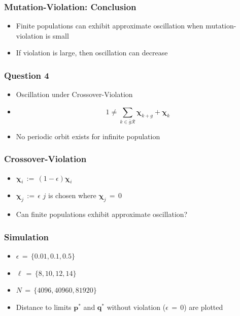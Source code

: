 \documentclass[aspectratio=169]{beamer}
\begin{document}
  
  \begin{frame}
    \frametitle{Mutation-Violation: Conclusion}
    \begin{itemize}      
      \setlength\itemsep{1em}
      \item{Finite populations can exhibit approximate oscillation when mutation-violation is small}
      \item{If violation is large, then oscillation can decrease}      
    \end{itemize}
  \end{frame}
  
   \begin{frame}
    \frametitle{Question 4}
    \begin{itemize}
      \item{Oscillation under Crossover-Violation}      
      \item
      \[	
	1 \neq \sum \limits_{k \in \bar{g}\mathcal{R}} \bm{\chi}_{k+g} + \bm{\chi}_k 
      \]
      \item{No periodic orbit exists for infinite population}
      
    \end{itemize}
  \end{frame}
  
  \begin{frame}
    \frametitle{Crossover-Violation}
    \begin{itemize}
      \setlength\itemsep{1em}
      \item{$\bm{\chi}_i \,:=\, (1 - \epsilon) \bm{\chi}_i$}
      \item{$\bm{\chi}_j \,:=\, \epsilon$  \hspace{1cm}  $j$ is chosen where $\bm{\chi}_j \,=\, 0$}
      \item{Can finite populations exhibit approximate oscillation?}
    \end{itemize}
  \end{frame}
  
  \begin{frame}
    \frametitle{Simulation}
    \begin{itemize}
      \setlength\itemsep{1em}
      \item{$\epsilon \,=\, \{0.01, 0.1, 0.5\}$}      
      \item{$\ell \,=\, \{8,10,12,14\}$}
      \item{$N \,=\, \{4096, 40960, 81920\}$}
      \item{Distance to limits $\bm{p}^\ast$ and $\bm{q}^\ast$ without violation ($\epsilon \,=\, 0$) are plotted }
    \end{itemize}
  \end{frame}
  
\end{document}
